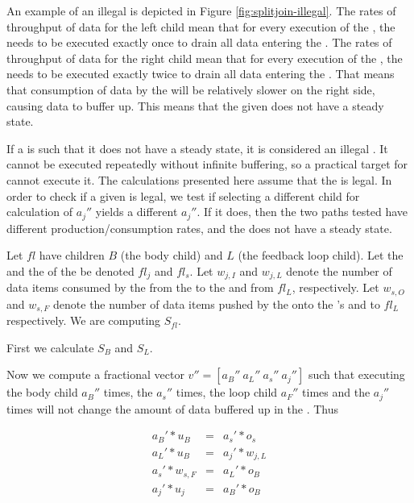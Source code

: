 An example of an illegal {\splitjoin} is depicted in Figure
\ref{fig:splitjoin-illegal}.  The rates of throughput of data for
the left child mean that for every execution of the {\splitter},
the {\joiner} needs to be executed exactly once to drain all data
entering the {\splitjoin}.  The rates of throughput of data for
the right child mean that for every execution of the {\splitter},
the {\joiner} needs to be executed exactly twice to drain all data
entering the {\splitjoin}. That means that consumption of data by
the {\joiner} will be relatively slower on the right side, causing
data to buffer up. This means that the given {\splitjoin} does not
have a steady state.

If a {\splitjoin} is such that it does not have a steady state, it
is considered an illegal {\splitjoin}.  It cannot be executed
repeatedly without infinite buffering, so a practical target for
{\StreamIt} cannot execute it.  The calculations presented here
assume that the {\splitjoin} is legal.  In order to check if a
given {\splitjoin} is legal, we test if selecting a different
child for calculation of $a_j''$ yields a different $a_j''$. If it
does, then the two paths tested have different
production/consumption rates, and the {\splitjoin} does not have a
steady state.

\subsubsubsection{{\feedbackloop}}

Let {{\feedbackloop}} $fl$ have children $B$ (the body child) and
$L$ (the feedback loop child). Let the {\joiner} and the
{\splitter} of the {{\feedbackloop}} be denoted $fl_j$ and $fl_s$.
Let $w_{j,I}$ and $w_{j,L}$ denote the number of data items
consumed by the {\joiner} from the {\Input} {{\Channel}} to the
{{\feedbackloop}} and from $fl_L$, respectively.  Let $w_{s,O}$ and
$w_{s,F}$ denote the number of data items pushed by the
{\splitter} onto the {{\feedbackloop}}'s {\Input} {{\Channel}} and
to $fl_L$ respectively.  We are computing $S_{fl}$.

First we calculate $S_{B}$ and $S_{L}$.

Now we compute a fractional vector $v'' = [a_B''\ a_L''\ a_s''\
a_j'']$ such that executing the body child $a_B''$ times, the
{\splitter} $a_s''$ times, the loop child $a_F''$ times and the
{\joiner} $a_j''$ times will not change the amount of data
buffered up in the {{\feedbackloop}}.  Thus

\begin{displaymath}
\begin{array}{rcl}
a_B' * u_B & = & a_s' * o_s \\
a_L' * u_B & = & a_j' * w_{j, L} \\
a_s' * w_{s, F} & = & a_L' * o_B \\
a_j' * u_j & = & a_B' * o_B \\
\end{array}
\end{displaymath}

